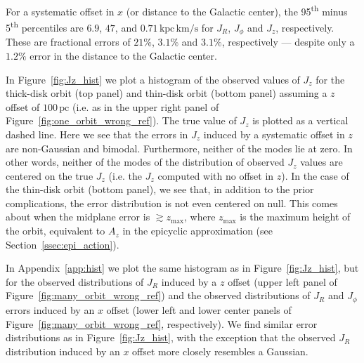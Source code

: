 \documentclass[twocolumn]{aastex62}
\newcommand{\pc}{\text{pc}}
\newcommand{\kms}{\text{km}/\text{s}}
\newcommand{\actunit}{\text{kpc}\,\kms}
\begin{document}
For a systematic offset in $x$ (or distance to the Galactic center), the
95\textsuperscript{th} minus 5\textsuperscript{th} percentiles are $6.9$,
$47$, and $0.71\,\actunit$ for $J_R$, $J_{\phi}$ and $J_z$, respectively.
These are fractional errors of $21\%$, $3.1\%$ and $3.1\%$, respectively ---
despite only a $1.2\%$ error in the distance to the Galactic center.

In Figure~\ref{fig:Jz_hist} we plot a histogram of the observed values of
$J_z$ for the thick-disk orbit (top panel) and thin-disk orbit (bottom panel)
assuming a $z$ offset of $100\,\pc$ (i.e. as in the upper right panel of
Figure~\ref{fig:one_orbit_wrong_ref}). The true value of $J_z$ is plotted as a
vertical dashed line. Here we see that the errors in $J_z$ induced by a
systematic offset in $z$ are non-Gaussian and bimodal. Furthermore, neither of
the modes lie at zero. In other words, neither of the modes of the
distribution of observed $J_z$ values are centered on the true $J_z$ (i.e. the
$J_z$ computed with no offset in $z$). In the case of the thin-disk orbit
(bottom panel), we see that, in addition to the prior complications, the error
distribution is not even centered on null. This comes about when the midplane
error is $\gtrsim z_{\text{max}}$, where $z_{\text{max}}$ is the maximum
height of the orbit, equivalent to $A_z$ in the epicyclic approximation (see
Section~\ref{ssec:epi_action}).

In Appendix~\ref{app:hist} we plot the same histogram as in
Figure~\ref{fig:Jz_hist}, but for the observed distributions of $J_R$ induced
by a $z$ offset (upper left panel of Figure~\ref{fig:many_orbit_wrong_ref})
and the observed distributions of $J_R$ and $J_{\phi}$ errors induced by an
$x$ offset (lower left and lower center panels of
Figure~\ref{fig:many_orbit_wrong_ref}, respectively). We find similar error
distributions as in Figure~\ref{fig:Jz_hist}, with the exception that the
observed $J_R$ distribution induced by an $x$ offset more closely resembles a
Gaussian.
\end{document}
